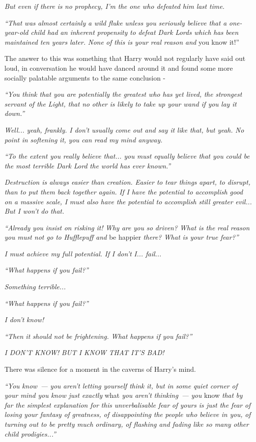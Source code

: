 \emph{But even if there is no prophecy, I'm the one who defeated him last time.}

\emph{``That was almost certainly a wild fluke unless you seriously believe that a one-year-old child had an inherent propensity to defeat Dark Lords which has been maintained ten years later. None of this is your real reason and} you know it!''

The answer to this was something that Harry would not regularly have said out loud, in conversation he would have danced around it and found some more socially palatable arguments to the same conclusion -

\emph{``You think that you are potentially the greatest who has yet lived, the strongest servant of the Light, that no other is likely to take up your wand if you lay it down.''}

\emph{Well... yeah, frankly. I don't usually come out and say it like that, but yeah. No point in softening it, you can read my mind anyway.}

\emph{``To the extent you really believe that... you must equally believe that you could be the most terrible Dark Lord the world has ever known.''}

\emph{Destruction is always easier than creation. Easier to tear things apart, to disrupt, than to put them back together again. If I have the potential to accomplish good on a massive scale, I must also have the potential to accomplish still greater evil... But I won't do that.}

\emph{``Already you insist on risking it! Why are you so driven? What is the real reason you must not go to Hufflepuff and} be happier \emph{there? What is your true fear?''}

\emph{I must achieve my full potential. If I don't I... fail...}

\emph{``What happens if you fail?''}

\emph{Something terrible...}

\emph{``What happens if you fail?''}

\emph{I don't know!}

\emph{``Then it should not be frightening. What happens if you fail?''}

\emph{I DON'T KNOW! BUT I KNOW THAT IT'S BAD!}

There was silence for a moment in the caverns of Harry's mind.

\emph{``You know~--- you aren't letting yourself think it, but in some quiet corner of your mind you know just exactly} what \emph{you aren't thinking~--- you} know \emph{that by far the simplest explanation for this unverbalisable fear of yours is just the fear of losing your fantasy of greatness, of disappointing the people who believe in you, of turning out to be pretty much ordinary, of flashing and fading like so many other child prodigies...''}

